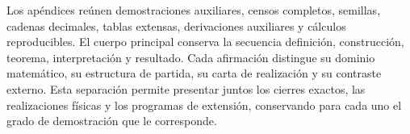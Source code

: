Los apéndices reúnen demostraciones auxiliares, censos completos, semillas,
cadenas decimales, tablas extensas, derivaciones auxiliares y cálculos
reproducibles. El cuerpo principal conserva la secuencia definición,
construcción, teorema, interpretación y resultado. Cada afirmación distingue
su dominio matemático, su estructura de partida, su carta de realización y su
contraste externo. Esta separación permite presentar juntos los cierres
exactos, las realizaciones físicas y los programas de extensión, conservando
para cada uno el grado de demostración que le corresponde.
